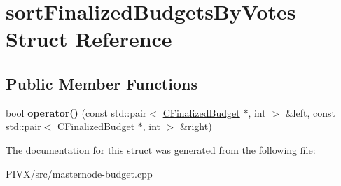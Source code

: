 \hypertarget{structsort_finalized_budgets_by_votes}{}\section{sort\+Finalized\+Budgets\+By\+Votes Struct Reference}
\label{structsort_finalized_budgets_by_votes}
\subsection*{Public Member Functions}
\begin{DoxyCompactItemize}
\item 
\mbox{\label{structsort_finalized_budgets_by_votes_afa884d1bbbe58624c6d3ff0e42e721eb}} 
bool {\bfseries operator()} (const std\+::pair$<$ \mbox{\hyperlink{class_c_finalized_budget}{C\+Finalized\+Budget}} $\ast$, int $>$ \&left, const std\+::pair$<$ \mbox{\hyperlink{class_c_finalized_budget}{C\+Finalized\+Budget}} $\ast$, int $>$ \&right)
\end{DoxyCompactItemize}


The documentation for this struct was generated from the following file\+:\begin{DoxyCompactItemize}
\item 
P\+I\+V\+X/src/masternode-\/budget.\+cpp\end{DoxyCompactItemize}
